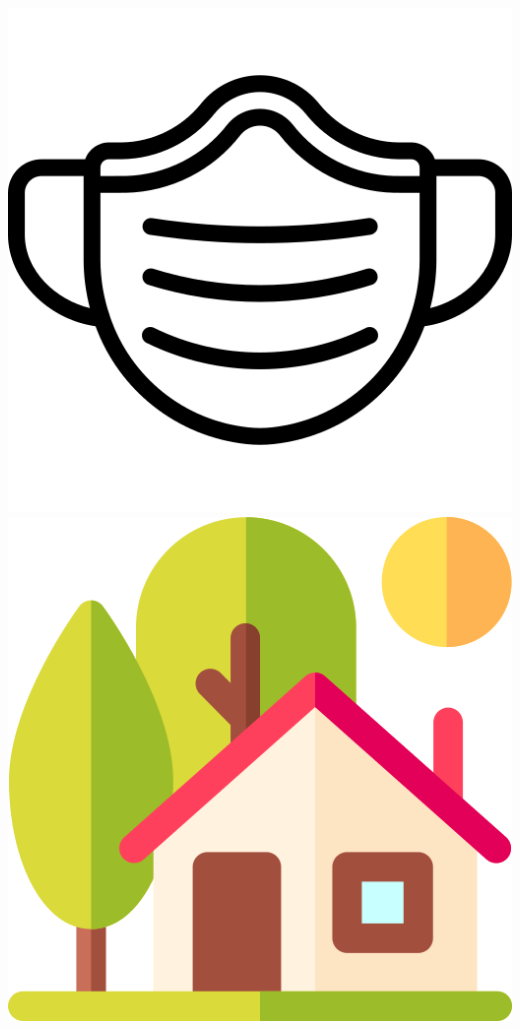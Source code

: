 \documentclass{beamer}
\begin{document}
\begin{CJK*}{UTF8}{bsmi}
\begin{frame}
\begin{columns}
\begin{column}{0.30\textwidth}
                \includegraphics[width=\textwidth, height=0.3\textheight]{mask.png}\\
                \includegraphics[height=0.3\textheight]{house.png}

\end{column}
\end{columns}
\end{frame}
\end{CJK*}
\end{document}
